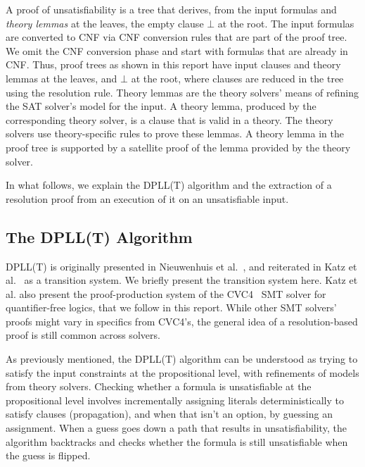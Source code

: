 \documentclass[11pt]{article}
\begin{document}
	A proof of unsatisfiability is a tree
	that derives, from the input formulas
	and \textit{theory lemmas} at the
	leaves, the empty clause $\bot$ at the root.
	The input formulas are converted to CNF
	via CNF conversion rules that are 
	part of the proof tree. We omit the 
	CNF conversion phase and start 
	with formulas that are already in 
	CNF. Thus, proof trees as shown in 
	this report have input clauses 
	and theory lemmas at the leaves, 
	and $\bot$ at the root, where 
	clauses are reduced in the tree 
	using the resolution rule. Theory 
	lemmas are the theory solvers' 
	means of refining the SAT solver's
	model for the input. A
	theory lemma, produced by the 
	corresponding theory
	solver, is a clause that is
	valid in a theory. The theory 
	solvers use theory-specific 
	rules to prove these 
	lemmas. A theory lemma in the 
	proof tree is supported by a 
	satellite proof of the lemma
	provided by the theory solver. 
	
	In what follows, we explain the 
	DPLL(T) algorithm and the 
	extraction of a resolution proof
	from an execution of it on an 
	unsatisfiable input.
	
	\subsection{The DPLL(T) Algorithm}
	\label{sec:dpllt}
	
	DPLL(T) is originally presented 
	in Nieuwenhuis et 
	al.~\cite{DBLP:journals/jacm/NieuwenhuisOT06}, 
	and reiterated in Katz et 
	al.~\cite{DBLP:conf/fmcad/KatzBTRH16} 
	as a transition system. We briefly present 
	the transition system here. Katz et al. also 
	present the proof-production system of the 
	CVC4~\cite{DBLP:conf/cav/BarrettCDHJKRT11} 
	SMT solver for quantifier-free logics,
	that we follow in this report. While 
	other SMT solvers'
	proofs might vary in specifics from 
	CVC4's, the general idea of a 
	resolution-based proof is still common 
	across solvers.
	
	As previously mentioned, the DPLL(T)
	algorithm can be understood as 
	trying to satisfy the input constraints
	at the propositional level, with 
	refinements of models from 
	theory solvers. Checking whether a
	formula is unsatisfiable at the 
	propositional level involves 
	incrementally assigning literals
	deterministically to satisfy clauses
	(propagation), and when that isn't an 
	option, by guessing an 
	assignment. When a guess goes 
	down a path that results in 
	unsatisfiability, the algorithm 
	backtracks and checks whether the 
	formula is still unsatisfiable 
	when the guess is flipped.
	
\end{document}
